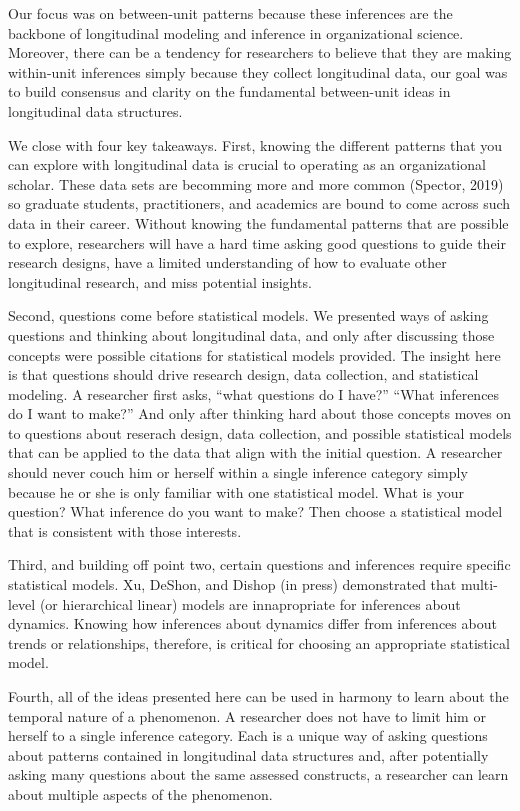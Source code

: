 \documentclass[english,,man]{apa6}
\begin{document}
Our focus was on between-unit patterns because these inferences are the backbone of longitudinal modeling and inference in organizational science. Moreover, there can be a tendency for researchers to believe that they are making within-unit inferences simply because they collect longitudinal data, our goal was to build consensus and clarity on the fundamental between-unit ideas in longitudinal data structures.

We close with four key takeaways. First, knowing the different patterns that you can explore with longitudinal data is crucial to operating as an organizational scholar. These data sets are becomming more and more common (Spector, 2019) so graduate students, practitioners, and academics are bound to come across such data in their career. Without knowing the fundamental patterns that are possible to explore, researchers will have a hard time asking good questions to guide their research designs, have a limited understanding of how to evaluate other longitudinal research, and miss potential insights.

Second, questions come before statistical models. We presented ways of asking questions and thinking about longitudinal data, and only after discussing those concepts were possible citations for statistical models provided. The insight here is that questions should drive research design, data collection, and statistical modeling. A researcher first asks, \enquote{what questions do I have?} \enquote{What inferences do I want to make?} And only after thinking hard about those concepts moves on to questions about reserach design, data collection, and possible statistical models that can be applied to the data that align with the initial question. A researcher should never couch him or herself within a single inference category simply because he or she is only familiar with one statistical model. What is your question? What inference do you want to make? Then choose a statistical model that is consistent with those interests.

Third, and building off point two, certain questions and inferences require specific statistical models. Xu, DeShon, and Dishop (in press) demonstrated that multi-level (or hierarchical linear) models are innapropriate for inferences about dynamics. Knowing how inferences about dynamics differ from inferences about trends or relationships, therefore, is critical for choosing an appropriate statistical model.

Fourth, all of the ideas presented here can be used in harmony to learn about the temporal nature of a phenomenon. A researcher does not have to limit him or herself to a single inference category. Each is a unique way of asking questions about patterns contained in longitudinal data structures and, after potentially asking many questions about the same assessed constructs, a researcher can learn about multiple aspects of the phenomenon.
\end{document}
